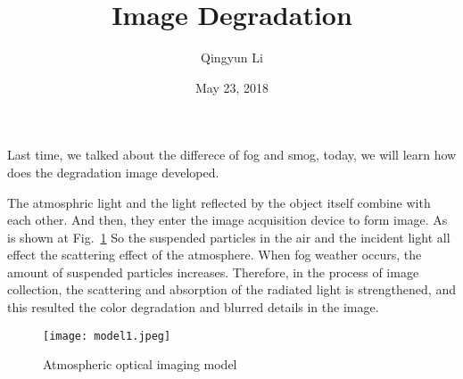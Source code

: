 \documentclass{article}
\author{Qingyun Li}
\date{May 23, 2018}
\title{Image Degradation}
\begin{document}
\maketitle
 \par Last time, we talked about the differece of fog and smog, today, we will learn how does the degradation image developed. 
 \par The atmosphric light and the light reflected by the object itself combine with each other. And then, they enter the image acquisition device to form image. As is shown at Fig.~\ref{model1} So the suspended particles in the air and the incident light all effect the scattering effect of the atmosphere. When fog weather occurs, the amount of suspended particles increases. Therefore, in the process of image collection, the scattering and absorption of the radiated light is strengthened, and this resulted the color degradation and blurred details in the image.
 \begin{figure}[htbp]
\begin{minipage}{1\linewidth}
\centering{}
\texttt{[image: model1.jpeg]}\\
\caption{Atmospheric optical imaging model}\label{model1}
\end{minipage}
\end{figure}


\end{document}
